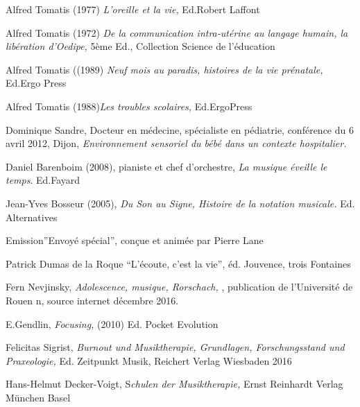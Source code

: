 \documentclass[12pt,french]{report}
\begin{document}
\begin{thebibliography}{10}
Alfred Tomatis (1977) \emph{L'oreille et la vie,}
Ed.Robert Laffont

Alfred Tomatis (1972) \emph{De la communication
intra-utérine au langage humain, la libération d'Oedipe,} 5ème Ed.,\emph{
}Collection Science de l'éducation

Alfred Tomatis ((1989) \emph{Neuf mois au paradis,
histoires de la vie prénatale,} Ed.Ergo Press

Alfred Tomatis (1988)\emph{Les troubles scolaires,}
Ed.ErgoPress

Dominique Sandre, Docteur en médecine, spécialiste
en pédiatrie, conférence du 6 avril 2012, Dijon, \emph{Environnement
sensoriel du bébé dans un contexte hospitalier.}

Daniel Barenboim (2008), pianiste et chef d'orchestre,
\emph{La musique éveille le temps}. Ed.Fayard

Jean-Yves Bosseur (2005), \emph{Du Son au Signe, Histoire
de la notation musicale. }Ed. Alternatives

Emission''Envoyé spécial'', conçue et animée par
Pierre Lane

Patrick Dumas de la Roque ``L'écoute, c'est la vie'',
éd. Jouvence, trois Fontaines 

Fern Nevjinsky,\emph{ Adolescence, musique, Rorschach,
}, publication de l'Université de Rouen n, source internet
décembre 2016.

E.Gendlin,\emph{ Focusing,} (2010) Ed. Pocket Evolution 

Felicitas Sigrist, \emph{Burnout und Musiktherapie,
Grundlagen, Forschungsstand und Praxeologie, }Ed. Zeitpunkt Musik,
Reichert Verlag Wiesbaden 2016

Hans-Helmut Decker-Voigt, S\emph{chulen der Musiktherapie,
}Ernst Reinhardt Verlag München Basel
\end{thebibliography}
\end{document}
